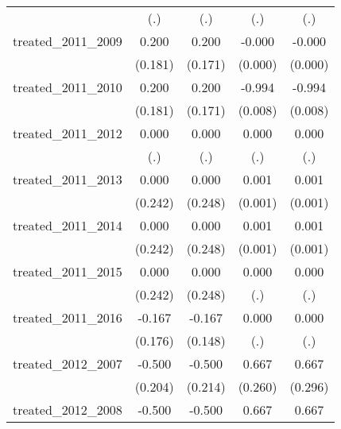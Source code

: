 {\begin{tabular}{l*{4}{c}}
            &         (.)         &         (.)         &         (.)         &         (.)         \\
[1em]
treated\_2011\_2009&       0.200         &       0.200         &      -0.000         &      -0.000         \\
            &     (0.181)         &     (0.171)         &     (0.000)         &     (0.000)         \\
[1em]
treated\_2011\_2010&       0.200         &       0.200         &      -0.994\sym{***}&      -0.994\sym{***}\\
            &     (0.181)         &     (0.171)         &     (0.008)         &     (0.008)         \\
[1em]
treated\_2011\_2012&       0.000         &       0.000         &       0.000         &       0.000         \\
            &         (.)         &         (.)         &         (.)         &         (.)         \\
[1em]
treated\_2011\_2013&       0.000         &       0.000         &       0.001         &       0.001         \\
            &     (0.242)         &     (0.248)         &     (0.001)         &     (0.001)         \\
[1em]
treated\_2011\_2014&       0.000         &       0.000         &       0.001         &       0.001         \\
            &     (0.242)         &     (0.248)         &     (0.001)         &     (0.001)         \\
[1em]
treated\_2011\_2015&       0.000         &       0.000         &       0.000         &       0.000         \\
            &     (0.242)         &     (0.248)         &         (.)         &         (.)         \\
[1em]
treated\_2011\_2016&      -0.167         &      -0.167         &       0.000         &       0.000         \\
            &     (0.176)         &     (0.148)         &         (.)         &         (.)         \\
[1em]
treated\_2012\_2007&      -0.500\sym{*}  &      -0.500\sym{*}  &       0.667\sym{*}  &       0.667\sym{*}  \\
            &     (0.204)         &     (0.214)         &     (0.260)         &     (0.296)         \\
[1em]
treated\_2012\_2008&      -0.500\sym{*}  &      -0.500\sym{*}  &       0.667\sym{*}  &       0.667\sym{*}  \\

\end{tabular}}
